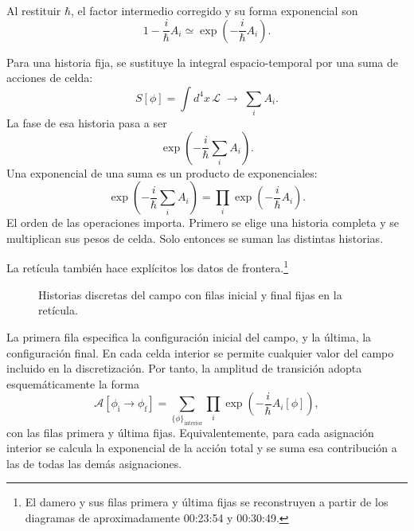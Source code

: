 Al restituir \(\hbar\), el factor intermedio corregido y su forma exponencial son
\begin{equation}
1-\frac{i}{\hbar}A_i
\simeq
\exp\!\left(-\frac{i}{\hbar}A_i\right).
\end{equation}

Para una historia fija, se sustituye la integral espacio-temporal por una suma de acciones de celda:
\begin{equation}
S[\phi]
=\int d^4x\,\mathcal{L}
\;\longrightarrow\;
\sum_i A_i.
\end{equation}
La fase de esa historia pasa a ser
\begin{equation}
\exp\!\left(-\frac{i}{\hbar}\sum_i A_i\right).
\end{equation}
Una exponencial de una suma es un producto de exponenciales:
\begin{equation}
\exp\!\left(-\frac{i}{\hbar}\sum_i A_i\right)
=
\prod_i\exp\!\left(-\frac{i}{\hbar}A_i\right).
\end{equation}
El orden de las operaciones importa. Primero se elige una historia completa y se multiplican sus pesos de celda. Solo entonces se suman las distintas historias.

La retícula también hace explícitos los datos de frontera.\footnote{El damero y sus filas primera y última fijas se reconstruyen a partir de los diagramas de aproximadamente 00:23:54 y 00:30:49.}
\begin{figure}[htbp]
\centering
{}
\caption{Historias discretas del campo con filas inicial y final fijas en la retícula.}
\end{figure}

La primera fila especifica la configuración inicial del campo, y la última, la configuración final. En cada celda interior se permite cualquier valor del campo incluido en la discretización. Por tanto, la amplitud de transición adopta esquemáticamente la forma
\begin{equation}
\mathcal{A}\!\left[\phi_{\mathrm{i}}\rightarrow\phi_{\mathrm{f}}\right]
=
\sum_{\{\phi\}_{\mathrm{interior}}}
\prod_i\exp\!\left(-\frac{i}{\hbar}A_i[\phi]\right),
\end{equation}
con las filas primera y última fijas. Equivalentemente, para cada asignación interior se calcula la exponencial de la acción total y se suma esa contribución a las de todas las demás asignaciones.

